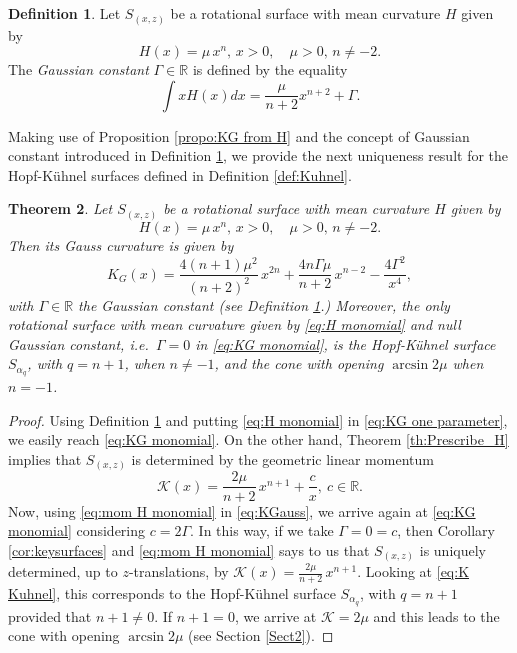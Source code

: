 \documentclass[leqno,11pt]{amsart}
\def\R{\mathbb{R}}
\newtheorem{theorem}{Theorem}[section]
\theoremstyle{definition}
\newtheorem{definition}[theorem]{Definition}
\numberwithin{equation}{section}
\begin{document}
\begin{definition}\label{def:Gaussian constant}
	Let $S_{(x,z)}$ be a rotational surface with mean curvature $H$ given by
	$$H(x)=\mu \, x^n, \, x>0, \quad \mu >0,  \, n \neq -2. $$ 
	The \textit{Gaussian constant} $\Gamma\in \R$ is defined by the equality
	$$
	\int x H(x)dx =\frac{\mu}{n+2}x^{n+2} + \Gamma.
	$$
\end{definition}
Making use of Proposition \ref{propo:KG from H} and the concept of Gaussian constant introduced in Definition \ref{def:Gaussian constant}, we provide the next uniqueness result for the Hopf-Kühnel surfaces defined in Definition \ref{def:Kuhnel}.

\begin{theorem}\label{Th:H KG mononomial}
	Let $S_{(x,z)}$ be a rotational surface with mean curvature $H$ given by 
	\begin{equation}\label{eq:H monomial}
		H(x)=\mu \, x^n, \, x>0, \quad \mu >0,  \, n \neq -2.
	\end{equation}
Then its Gauss curvature is given by
\begin{equation}\label{eq:KG monomial}
K_G(x) = \dfrac{4(n+1)\mu^2}{(n+2)^2} \, x^{2n} + \dfrac{4n  \Gamma  \mu }{n+2}\, x^{n-2}
-	\dfrac{4\Gamma^2}{x^4},
\end{equation}
with $\Gamma \in \R$ the Gaussian constant (see Definition \ref{def:Gaussian constant}.)
Moreover, the only rotational surface with mean curvature given by \eqref{eq:H monomial} and null Gaussian constant, i.e.\ $\Gamma =0$ in \eqref{eq:KG monomial}, is the Hopf-Kühnel surface $S_{\alpha_q}$, with $q=n+1$, when $n\neq -1$, and the cone with opening $\arcsin 2\mu$ when $n=-1$.
\end{theorem}

\begin{proof}
Using Definition \ref{def:Gaussian constant} and putting \eqref{eq:H monomial} in \eqref{eq:KG one parameter}, we easily reach \eqref{eq:KG monomial}. On the other hand, Theorem \ref{th:Prescribe_H} implies that $S_{(x,z)}$ is determined  by the geometric linear momentum
\begin{equation}\label{eq:mom H monomial}
\mathcal K (x)=\dfrac{2\mu}{n+2}\, x^{n+1}+ \dfrac{c}{x}, \  c\in \R.
\end{equation}
Now, using \eqref{eq:mom H monomial} in \eqref{eq:KGauss}, we arrive again at \eqref{eq:KG monomial} considering $c=2\Gamma$.
In this way, if we take $\Gamma=0=c$, then Corollary \ref{cor:keysurfaces} and \eqref{eq:mom H monomial} says  to us that $S_{(x,z)}$ is uniquely determined, up to $z$-translations, by $\mathcal K (x)=\frac{2\mu}{n+2}\, x^{n+1}$. Looking at \eqref{eq:K Kuhnel}, this corresponds to the Hopf-Kühnel surface $S_{\alpha_q}$, with $q=n+1$ provided that $n+1\neq 0$. If $n+1=0$, we arrive at $\mathcal K =2\mu$ and this leads to the cone with opening $\arcsin 2\mu$ (see Section \ref{Sect2}).
\end{proof}
\end{document}
